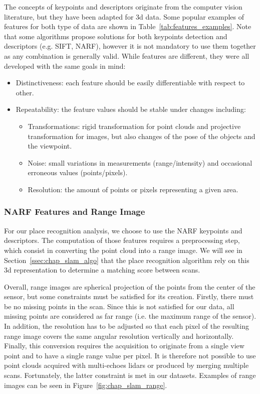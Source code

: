 The concepts of keypoints and descriptors originate from the computer vision literature, but they have been adapted for \gls*{3d} data. Some popular examples of features for both type of data are shown in Table~\ref{tab:features_examples}. Note that some algorithms propose solutions for both keypoints detection and descriptors (e.g. SIFT, NARF), however it is not mandatory to use them together as any combination is generally valid. While features are different, they were all developed with the same goals in mind:
\begin{itemize}[label=$\bullet$,noitemsep,topsep=0pt]
    \item Distinctiveness: each feature should be easily differentiable with respect to other.
    \item Repeatability: the feature values should be stable under changes including:
        \begin{itemize}[label=$\circ$,noitemsep,topsep=0pt]
            \item Transformations: rigid transformation for point clouds and projective transformation for images, but also changes of the pose of the objects and the viewpoint.
            \item Noise: small variations in measurements (range/intensity) and occasional erroneous values (points/pixels).
            \item Resolution: the amount of points or pixels representing a given area.
        \end{itemize}
\end{itemize}


\subsubsection{NARF Features and Range Image}
\label{ssub:NARF Features and Range Image}

For our place recognition analysis, we choose to use the NARF keypoints and descriptors. The computation of those features requires a preprocessing step, which consist in converting the point cloud into a range image. We will see in Section~\ref{ssec:chap_slam_algo} that the place recognition algorithm rely on this \gls*{3d} representation to determine a matching score between scans.

Overall, range images are spherical projection of the points from the center of the sensor, but some constraints must be satisfied for its creation. Firstly, there must be no missing points in the scan. Since this is not satisfied for our data, all missing points are considered as far range (i.e. the maximum range of the sensor). In addition, the resolution has to be adjusted so that each pixel of the resulting range image covers the same angular resolution vertically and horizontally. Finally, this conversion requires the acquisition to originate from a single view point and to have a single range value per pixel. It is therefore not possible to use point clouds acquired with multi-echoes \gls*{lidar}s or produced by merging multiple scans. Fortunately, the latter constraint is met in our datasets. Examples of range images can be seen in Figure~\ref{fig:chap_slam_range}.

